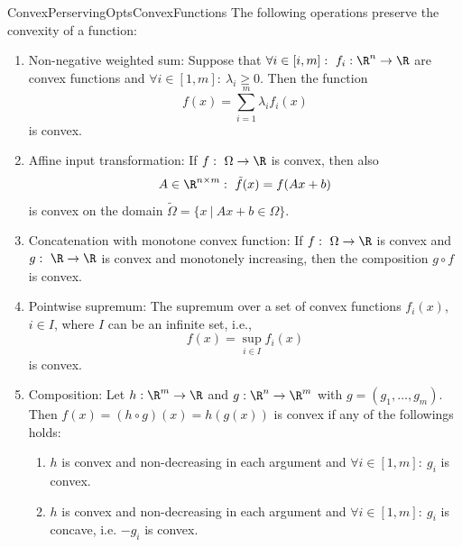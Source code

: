 \begin{pro}{ConvexPerservingOptsConvexFunctions}
    The following operations preserve the convexity of a function:
    \begin{enumerate}
        \item 
            Non-negative weighted sum: Suppose that $\forall i \in [i,m]: \ f_i: \R^n \rightarrow \R$ are convex functions and $\forall i \in [1,m]: \ \lambda_i \geq 0$. Then the function
                \begin{equation*}
                    f(x) = \sum_{i=1}^m \lambda_i f_i(x)
                \end{equation*}
            is convex. 
        \item 
            Affine input transformation: If $f: \ \Omega \rightarrow \R$ is convex, then also
            \begin{equation*}
                A \in \R^{n \times m}: \ \tilde{f}(x) = f(Ax + b)
            \end{equation*}
            is convex on the domain $\tilde{\Omega} = \{x \ | \ Ax + b \in \Omega\}$.
        \item 
            Concatenation with monotone convex function: If $f: \ \Omega \rightarrow \R$ is convex and $g: \ \R \rightarrow \R$ is convex and monotonely increasing, then the composition $g \circ f$ is convex.
        \item 
            Pointwise supremum: The supremum over a set of convex functions $f_i(x)$, $i \in I$, where $I$ can be an infinite set, i\@.e\@.,
            \begin{equation*}
                f(x) = \sup_{i \in I} f_i(x)
            \end{equation*}
            is convex.
        \item 
            Composition: Let $h: \R^m \rightarrow \R$ and $g: \R^n \rightarrow \R^m$ with $g = (g_1, \ldots, g_m)$. Then $f(x) = (h \circ g)(x) = h(g(x))$ is convex if any of the followings holds: 
            \begin{enumerate}
                \item 
                    $h$ is convex and non-decreasing in each argument and $\forall i \in [1,m]: \ g_i$ is convex.
                \item 
                    $h$ is convex and non-decreasing in each argument and $\forall i \in [1,m]: \ g_i$ is concave, i\@.e\@. $-g_i$ is convex.
            \end{enumerate}
    \end{enumerate}
    \vspace*{-0.2cm}
\end{pro}

